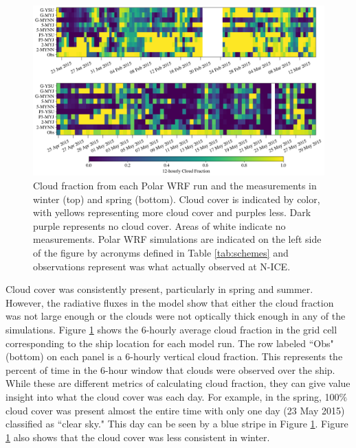 \begin{figure}[h!]
    \centering \hspace*{-0.5cm}
    \includegraphics[width=1.1\linewidth]{figures/chapter3/WRF_Clouds.png}
    \caption[Polar WRF simulated cloud fraction.]{Cloud fraction from each Polar WRF run and the measurements in winter (top) and spring (bottom). Cloud cover is indicated by color, with yellows representing more cloud cover and purples less. Dark purple represents no cloud cover. Areas of white indicate no measurements. Polar WRF simulations are indicated on the left side of the figure by acronyms defined in Table \ref{tab:schemes} and observations represent was what actually observed at N-ICE.}
\label{fig:wrf_cloudfrac}
\end{figure}

Cloud cover was consistently present, particularly in spring and summer. However, the radiative fluxes in the model show that either the cloud fraction was not large enough or the clouds were not optically thick enough in any of the simulations. Figure \ref{fig:wrf_cloudfrac} shows the 6-hourly average cloud fraction in the grid cell corresponding to the ship location for each model run. The row labeled ``Obs" (bottom) on each panel is a 6-hourly vertical cloud fraction. This represents the percent of time in the 6-hour window that clouds were observed over the ship. While these are different metrics of calculating cloud fraction, they can give value insight into what the cloud cover was each day. For example, in the spring, 100$\%$ cloud cover was present almost the entire time with only one day (23 May 2015) classified as ``clear sky." This day can be seen by a blue stripe in Figure \ref{fig:wrf_cloudfrac}. Figure \ref{fig:wrf_cloudfrac} also shows that the cloud cover was less consistent in winter. 

